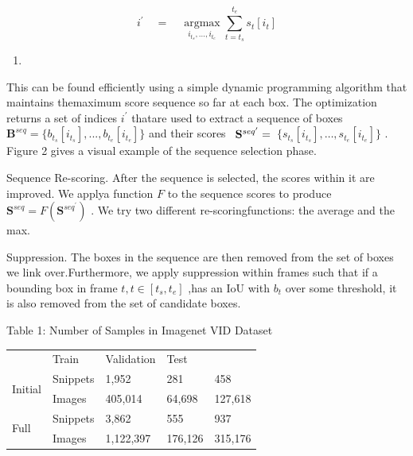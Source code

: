 \documentclass[
  10
]{article}
\newcounter{none} %
\providecommand{\tightlist}{%
  \setlength{\itemsep}{0pt}\setlength{\parskip}{0pt}}
\begin{document}
\[
i ^ {\prime} \quad = \quad \underset {i _ {t _ {s}}, \dots , i _ {t _ {e}}} {\operatorname {a r g m a x}} \sum_ {t = t _ {s}} ^ {t _ {e}} s _ {t} [ i _ {t} ]
\]

\begin{enumerate}
\def\labelenumi{(\arabic{enumi})}
\tightlist
\item
\end{enumerate}

This can be found efficiently using a simple dynamic programming
algorithm that maintains themaximum score sequence so far at each box.
The optimization returns a set of indices \(i ^ { \prime }\) thatare
used to extract a sequence of boxes
\(\mathbf { B } ^ { s e q } = \{ b _ { t _ { s } } [ i _ { t _ { s } } ] , . . . , b _ { t _ { e } } [ i _ { t _ { e } } ] \}\)
and their scores
\(\begin{array} { r l } { \mathbf { S } ^ { s e q ^ { \prime } } = } \end{array}\)\(\{ s _ { t _ { s } } [ i _ { t _ { s } } ] , \ldots , s _ { t _ { e } } [ i _ { t _ { e } } ] \}\)
. Figure 2 gives a visual example of the sequence selection phase.

Sequence Re-scoring. After the sequence is selected, the scores within
it are improved. We applya function \(F\) to the sequence scores to
produce
\(\mathbf { S } ^ { s e q } = F ( \mathbf { S } ^ { s e q ^ { \prime } } )\)
. We try two different re-scoringfunctions: the average and the max.

Suppression. The boxes in the sequence are then removed from the set of
boxes we link over.Furthermore, we apply suppression within frames such
that if a bounding box in frame \(t , t \in [ t _ { s } , t _ { e } ]\)
,has an IoU with \(b _ { t }\) over some threshold, it is also removed
from the set of candidate boxes.

Table 1: Number of Samples in Imagenet VID Dataset

{\def\LTcaptype{none} %
\begin{longtable}[]{@{}lllll@{}}
\toprule\noalign{}
\endhead
\bottomrule\noalign{}
\endlastfoot
\multicolumn{2}{@{}l}{%
} & Train & Validation & Test \\
\multirow{2}{*}{Initial} & Snippets & 1,952 & 281 & 458 \\
& Images & 405,014 & 64,698 & 127,618 \\
\multirow{2}{*}{Full} & Snippets & 3,862 & 555 & 937 \\
& Images & 1,122,397 & 176,126 & 315,176 \\
\end{longtable}
}
\end{document}
